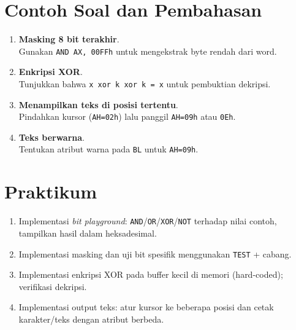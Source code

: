 \section{Contoh Soal dan Pembahasan}
\begin{enumerate}
  \item \textbf{Masking 8 bit terakhir}.\\ Gunakan \texttt{AND AX, 00FFh} untuk mengekstrak byte rendah dari word.
  \item \textbf{Enkripsi XOR}.\\ Tunjukkan bahwa \texttt{x xor k xor k = x} untuk pembuktian dekripsi.
  \item \textbf{Menampilkan teks di posisi tertentu}.\\ Pindahkan kursor (\texttt{AH=02h}) lalu panggil \texttt{AH=09h} atau \texttt{0Eh}.
  \item \textbf{Teks berwarna}.\\ Tentukan atribut warna pada \texttt{BL} untuk \texttt{AH=09h}.
\end{enumerate}

\section{Praktikum}
\begin{enumerate}
  \item Implementasi \textit{bit playground}: \texttt{AND}/\texttt{OR}/\texttt{XOR}/\texttt{NOT} terhadap nilai contoh, tampilkan hasil dalam heksadesimal.
  \item Implementasi masking dan uji bit spesifik menggunakan \texttt{TEST} + cabang.
  \item Implementasi enkripsi XOR pada buffer kecil di memori (hard-coded); verifikasi dekripsi.
  \item Implementasi output teks: atur kursor ke beberapa posisi dan cetak karakter/teks dengan atribut berbeda.
\end{enumerate}

